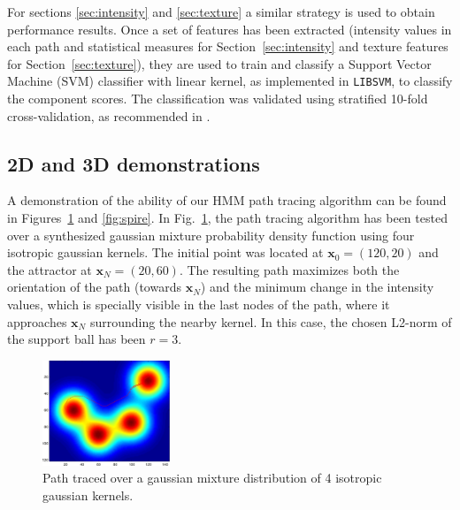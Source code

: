 For sections \ref{sec:intensity} and \ref{sec:texture} a similar strategy is used to obtain performance results. Once a set of features has been extracted (intensity values in each path and statistical measures for Section~\ref{sec:intensity} and texture features for Section~\ref{sec:texture}), they are used to train and classify a Support Vector Machine (SVM) classifier with linear kernel, as implemented in \texttt{LIBSVM}\cite{Chang2001}, to classify the component scores. The classification was validated using stratified 10-fold cross-validation, as recommended in \cite{Kohavi1995a}.

\subsection{2D and 3D demonstrations}\label{sec:demo}
A demonstration of the ability of our \ac{HMM} path tracing algorithm can be found in Figures~\ref{fig:gaussian} and \ref{fig:spire}. In Fig.~\ref{fig:gaussian}, the path tracing algorithm has been tested over a synthesized gaussian mixture probability density function using four isotropic gaussian kernels. The initial point was located at $\mathbf{x}_0 = (120,20)$ and the attractor at $\mathbf{x}_N = (20, 60)$. The resulting path maximizes both the orientation of the path (towards $\mathbf{x}_N$) and the minimum change in the intensity values, which is specially visible in the last nodes of the path, where it approaches $\mathbf{x}_N$ surrounding the nearby kernel. In this case, the chosen L2-norm of the support ball has been $r=3$. 
\begin{figure}
	\begin{center}
		\includegraphics[width=1.5in]{Graphics/ch6/gaussian}
		\caption{Path traced over a gaussian mixture distribution of 4 isotropic gaussian kernels.}
		\label{fig:gaussian}
	\end{center}
\end{figure}

